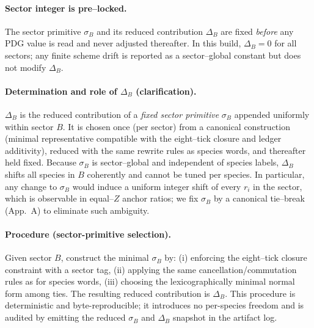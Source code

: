\documentclass[epjc3]{svjour3}
\begin{document}
\paragraph{Sector integer is pre–locked.}
The sector primitive $\sigma_B$ and its reduced contribution $\Delta_B$ are
fixed \emph{before} any PDG value is read and never adjusted thereafter.
In this build, $\Delta_B=0$ for all sectors; any finite scheme drift is
reported as a sector–global constant but does not modify $\Delta_B$.

\paragraph{Determination and role of $\Delta_B$ (clarification).}
$\Delta_B$ is the reduced contribution of a \emph{fixed sector primitive} $\sigma_B$ appended uniformly within sector $B$. It is chosen once (per sector) from a canonical construction (minimal representative compatible with the eight--tick closure and ledger additivity), reduced with the same rewrite rules as species words, and thereafter held fixed. Because $\sigma_B$ is sector--global and independent of species labels, $\Delta_B$ shifts all species in $B$ coherently and cannot be tuned per species. In particular, any change to $\sigma_B$ would induce a uniform integer shift of every $r_i$ in the sector, which is observable in equal--$Z$ anchor ratios; we fix $\sigma_B$ by a canonical tie--break (App.~A) to eliminate such ambiguity.

\paragraph{Procedure (sector-primitive selection).}
Given sector $B$, construct the minimal $\sigma_B$ by: (i) enforcing the eight--tick closure constraint with a sector tag, (ii) applying the same cancellation/commutation rules as for species words, (iii) choosing the lexicographically minimal normal form among ties. The resulting reduced contribution is $\Delta_B$. This procedure is deterministic and byte-reproducible; it introduces no per-species freedom and is audited by emitting the reduced $\sigma_B$ and $\Delta_B$ snapshot in the artifact log.
\end{document}
